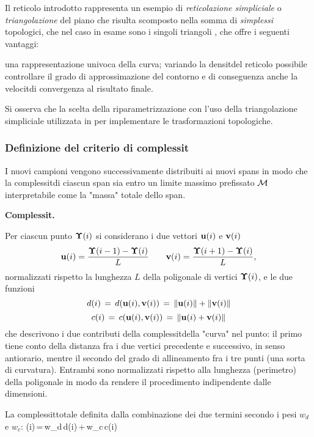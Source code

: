 Il reticolo introdotto rappresenta un esempio di {\it reticolazione simpliciale} o 
{\it triangolazione} del piano che risulta scomposto nella somma di {\it simplessi} topologici,
che nel caso in esame sono i singoli triangoli \footnotemark, che offre i seguenti vantaggi:


\bi 
\im una rappresentazione univoca della curva;
\im variando la densit\a del reticolo \e possibile controllare il grado di 
approssimazione del contorno e di conseguenza anche
la velocit\a di convergenza al risultato finale.
\ei

Si osserva che la scelta della riparametrizzazione con l'uso della triangolazione simpliciale
\e utilizzata in \cite{Terzopoulos} per implementare le trasformazioni topologiche.
 
\subsubsection{Definizione del criterio di complessit\a}

I nuovi campioni vengono successivamente distribuiti ai nuovi spans in modo che la 
complessit\a di ciascun span sia entro un limite massimo prefissato ${\cal M}$ interpretabile
come la "massa" totale dello span.

\bdf
{\bf Complessit\a.}\par
Per ciascun punto ${\bf \Upsilon}(i)$ si considerano i due vettori ${\bf u}(i)$ e ${\bf v}(i)$
$$
{\bf u}(i)=\frac{{\bf \Upsilon}(i-1)-{\bf \Upsilon}(i)}{L} \qquad
{\bf v}(i)=\frac{{\bf \Upsilon}(i+1)-{\bf \Upsilon}(i)}{L},
$$
normalizzati rispetto la lunghezza $L$ della poligonale di vertici ${\bf \Upsilon}(i)$, e le due
funzioni 
$$
d(i)\,=\,d({\bf u}(i),{\bf v}(i))\,=\,\|{\bf u}(i)\|+\|{\bf v}(i)\|
$$
$$
c(i)\,=\,c({\bf u}(i),{\bf v}(i))\,=\,\|{\bf u}(i)+{\bf v}(i)\|
$$
che descrivono i due contributi della complessit\a della "curva" nel punto: il primo tiene
conto della distanza fra i due vertici precedente e successivo, in senso antiorario, mentre
il secondo del grado di allineamento fra i tre punti (una sorta di curvatura).
Entrambi sono normalizzati rispetto alla lunghezza (perimetro) della poligonale in modo
da rendere il procedimento indipendente dalle dimensioni.

La complessit\a totale \e definita dalla combinazione dei due termini secondo i pesi $w_d$ e
$w_c$:
\be
\mu(i)\,=\,w_d\,d(i)\,+\,w_c\,c(i)
\ee
\edf

